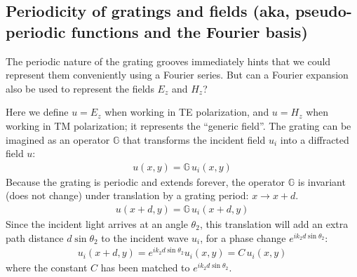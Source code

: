 \subsection{Periodicity of gratings and fields (aka, pseudo-periodic functions and the Fourier basis)}
The periodic nature of the grating grooves immediately hints that we could represent them conveniently using a Fourier series.  But can a Fourier expansion also be used to represent the fields $E_z$ and $H_z$?

Here we define $u = E_z$ when working in TE polarization, and $u = H_z$ when working in TM polarization; it represents the ``generic field''.  The grating can be imagined as an operator $\mathbb{G}$ that transforms the incident field $u_i$ into a diffracted field $u$:
\begin{eqnarray}
u(x,y) = \mathbb{G} \, u_i(x,y)
\end{eqnarray}
Because the grating is periodic and extends forever, the operator $\mathbb{G}$ is invariant (does not change) under translation by a grating period: $x \rightarrow x+d$.  
\begin{eqnarray}
u(x+d,y) = \mathbb{G} \, u_i(x+d,y)
\end{eqnarray}
Since the incident light arrives at an angle $\theta_2$, this translation will add an extra path distance $d \sin \theta_2$ to the incident wave $u_i$, for a phase change $e^{i k_2 d \sin \theta_2}$:
\begin{eqnarray}
u_i(x+d, y) = e^{i k_2 d \sin \theta_2} u_i(x, y) = C \, u_i(x,y)
\end{eqnarray}
where the constant $C$ has been matched to $e^{i k_2 d \sin \theta_2}$.

